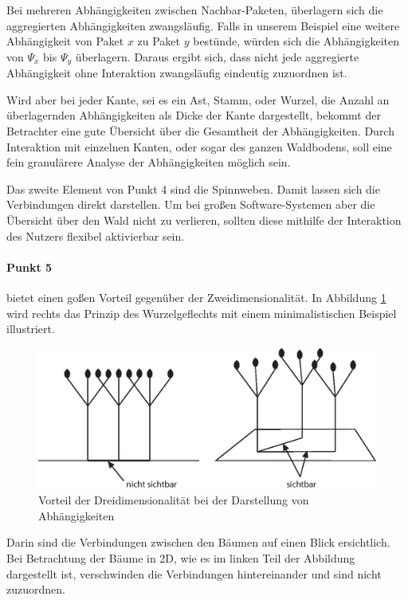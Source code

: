 Bei mehreren Abhängigkeiten zwischen Nachbar-Paketen, überlagern sich die aggregierten Abhängigkeiten zwangsläufig. Falls in unserem Beispiel eine weitere Abhängigkeit von Paket $x$ zu Paket $y$ bestünde, würden sich die Abhängigkeiten von $\Psi_x$ bis $\Psi_y$ überlagern. Daraus ergibt sich, dass nicht jede aggregierte Abhängigkeit ohne Interaktion zwangsläufig eindeutig zuzuordnen ist.

Wird aber bei jeder Kante, sei es ein Ast, Stamm, oder Wurzel, die Anzahl an überlagernden Abhängigkeiten als Dicke der Kante dargestellt, bekommt der Betrachter eine gute Übersicht über die Gesamtheit der Abhängigkeiten. Durch Interaktion mit einzelnen Kanten, oder sogar des ganzen Waldbodens, soll eine fein granulärere Analyse der Abhängigkeiten möglich sein.

Das zweite Element von Punkt 4 sind die Spinnweben. Damit lassen sich die Verbindungen direkt darstellen. Um bei großen Software-Systemen aber die Übersicht über den Wald nicht zu verlieren, sollten diese mithilfe der Interaktion des Nutzers flexibel aktivierbar sein.

\paragraph{Punkt 5} bietet einen goßen Vorteil gegenüber der Zweidimensionalität. In Abbildung \ref{fig:3d-advantage} wird rechts das Prinzip des Wurzelgeflechts mit einem minimalistischen Beispiel illustriert.

\begin{figure}[htb]
  \includegraphics[width=.8\textwidth]{figures/3d-advantage}
  \caption{Vorteil der Dreidimensionalität bei der Darstellung von Abhängigkeiten}
  \label{fig:3d-advantage}
\end{figure}

Darin sind die Verbindungen zwischen den Bäumen auf einen Blick ersichtlich. Bei Betrachtung der Bäume in 2D, wie es im linken Teil der Abbildung dargestellt ist, verschwinden die Verbindungen hintereinander und sind nicht zuzuordnen.\\

